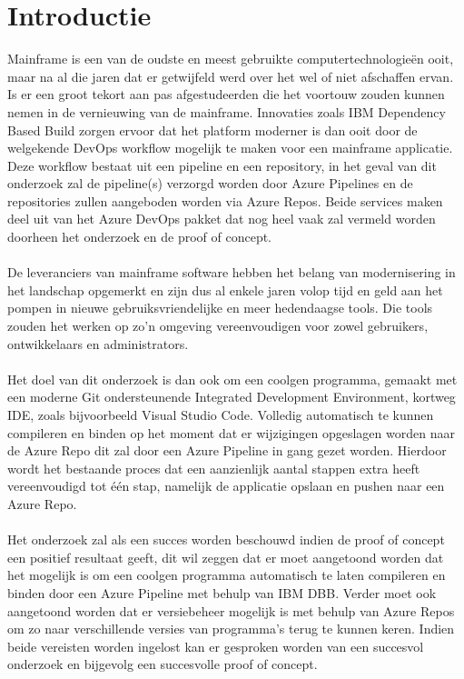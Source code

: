 
\section{Introductie}%
\label{sec:introductie}

Mainframe is een van de oudste en meest gebruikte computertechnologieën ooit, maar na al die jaren dat er getwijfeld werd over het wel of niet afschaffen ervan. 
Is er een groot tekort aan pas afgestudeerden die het voortouw zouden kunnen nemen in de vernieuwing van de mainframe. 
Innovaties zoals IBM Dependency Based Build zorgen ervoor dat het platform moderner is dan ooit door de welgekende DevOps workflow mogelijk te maken voor een mainframe applicatie. 
Deze workflow bestaat uit een pipeline en een repository, in het geval van dit onderzoek zal de pipeline(s) verzorgd worden door Azure Pipelines en de repositories zullen aangeboden worden via Azure Repos. 
Beide services maken deel uit van het Azure DevOps pakket dat nog heel vaak zal vermeld worden doorheen het onderzoek en de proof of concept.
\\ \\
De leveranciers van mainframe software hebben het belang van modernisering in het landschap opgemerkt en zijn dus al enkele jaren volop tijd en geld aan het pompen in nieuwe gebruiksvriendelijke en meer hedendaagse tools.
Die tools zouden het werken op zo'n omgeving vereenvoudigen voor zowel gebruikers, ontwikkelaars en administrators. 
\\ \\
Het doel van dit onderzoek is dan ook om een coolgen programma, gemaakt met een moderne Git ondersteunende Integrated Development Environment, kortweg IDE, zoals bijvoorbeeld Visual Studio Code.
Volledig automatisch te kunnen compileren en binden op het moment dat er wijzigingen opgeslagen worden naar de Azure Repo dit zal door een Azure Pipeline in gang gezet worden.
Hierdoor wordt het bestaande proces dat een aanzienlijk aantal stappen extra heeft vereenvoudigd tot één stap, namelijk de applicatie opslaan en pushen naar een Azure Repo. 
\\ \\
Het onderzoek zal als een succes worden beschouwd indien de proof of concept een positief resultaat geeft, dit wil zeggen dat er moet aangetoond worden dat het mogelijk is om een coolgen programma 
automatisch te laten compileren en binden door een Azure Pipeline met behulp van IBM DBB. 
Verder moet ook aangetoond worden dat er versiebeheer mogelijk is met behulp van Azure Repos om zo naar verschillende versies van programma's terug te kunnen keren. 
Indien beide vereisten worden ingelost kan er gesproken worden van een succesvol onderzoek en bijgevolg een succesvolle proof of concept. 

